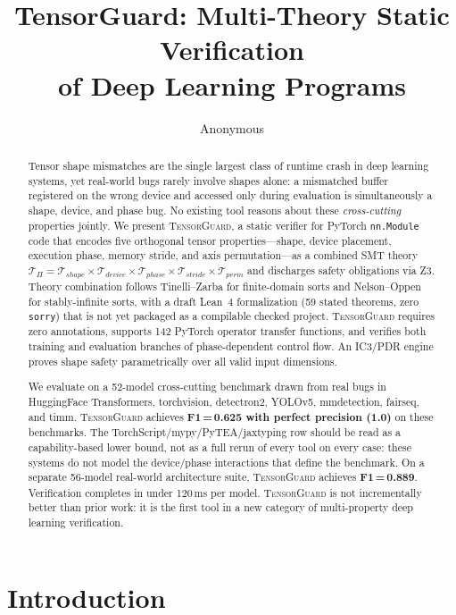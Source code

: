 \documentclass[10pt]{article}
\title{TensorGuard: Multi-Theory Static Verification\\of Deep Learning Programs}
\author{Anonymous}
\date{}
\newcommand{\tguard}{\textsc{TensorGuard}}
\newcommand{\Tshape}{\mathcal{T}_{\mathit{shape}}}
\newcommand{\Tdevice}{\mathcal{T}_{\mathit{device}}}
\newcommand{\Tphase}{\mathcal{T}_{\mathit{phase}}}
\newcommand{\Tstride}{\mathcal{T}_{\mathit{stride}}}
\newcommand{\Tperm}{\mathcal{T}_{\mathit{perm}}}
\newcommand{\Tprod}{\mathcal{T}_{\Pi}}
\theoremstyle{plain}
\theoremstyle{definition}
\theoremstyle{remark}
\begin{document}
\maketitle

\begin{abstract}
Tensor shape mismatches are the single largest class of runtime crash
in deep learning systems, yet real-world bugs rarely involve shapes
alone: a mismatched buffer registered on the wrong device and accessed
only during evaluation is simultaneously a shape, device, and phase
bug.  No existing tool reasons about these \emph{cross-cutting}
properties jointly.  We present \tguard{}, a static verifier for
PyTorch \texttt{nn.Module} code that encodes five orthogonal tensor
properties---shape, device placement, execution phase, memory stride,
and axis permutation---as a combined SMT theory
$\Tprod = \Tshape \times \Tdevice \times \Tphase \times \Tstride
\times \Tperm$ and discharges safety obligations via Z3.  Theory
combination follows Tinelli--Zarba for finite-domain sorts and
Nelson--Oppen for stably-infinite sorts, with a draft Lean~4
formalization (59 stated theorems, zero \texttt{sorry}) that is not
yet packaged as a compilable checked project.  \tguard{} requires zero
annotations, supports 142 PyTorch operator transfer functions, and
verifies both training and evaluation branches of phase-dependent
control flow.  An IC3/PDR engine proves shape safety parametrically
over all valid input dimensions.

We evaluate on a 52-model cross-cutting benchmark drawn from real
bugs in HuggingFace Transformers, torchvision, detectron2, YOLOv5,
mmdetection, fairseq, and timm.  \tguard{} achieves
\textbf{F1\,=\,0.625 with perfect precision (1.0)} on these
benchmarks. The TorchScript/mypy/PyTEA/jaxtyping row should be read as
a capability-based lower bound, not as a full rerun of every tool on
every case: these systems do not model the device/phase interactions
that define the benchmark. On a separate 56-model
real-world architecture suite, \tguard{} achieves
\textbf{F1\,=\,0.889}.  Verification completes in under 120\,ms per
model.  \tguard{} is not incrementally better than prior work: it is
the first tool in a new category of multi-property deep learning
verification.
\end{abstract}

\section{Introduction}\label{sec:intro}
\end{document}
